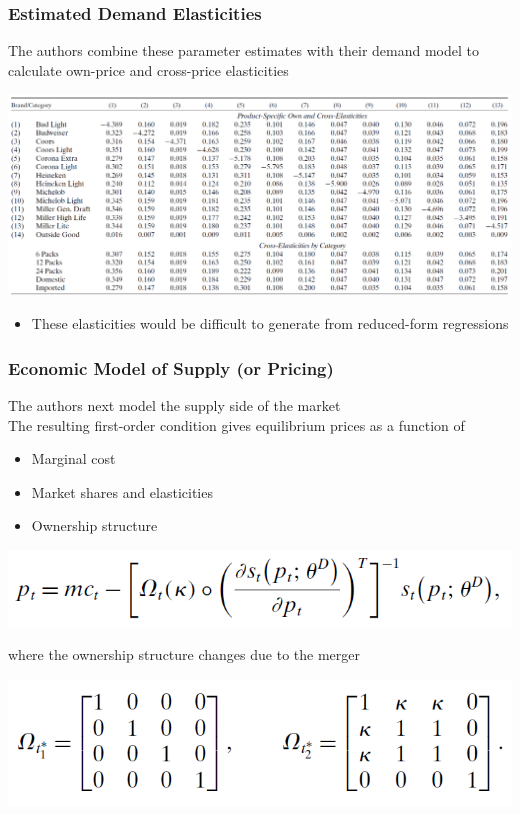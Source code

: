 \documentclass{beamer}
\begin{document}
\begin{frame}\frametitle{Estimated Demand Elasticities}
    The authors combine these parameter estimates with their demand model to calculate own-price and cross-price elasticities
    \begin{center}
        \includegraphics[width=0.95\linewidth]{table_5}
    \end{center}
    \begin{itemize}
        \item These elasticities would be difficult to generate from reduced-form regressions
    \end{itemize}
\end{frame}

\begin{frame}\frametitle{Economic Model of Supply (or Pricing)}
    The authors next model the supply side of the market \\
    \vspace{2ex}
    The resulting first-order condition gives equilibrium prices as a function of
    \begin{itemize}
        \item Marginal cost
        \item Market shares and elasticities
        \item Ownership structure
    \end{itemize}
    \begin{center}
        \includegraphics[width=0.6\linewidth]{eq_9}
    \end{center}
    where the ownership structure changes due to the merger
    \begin{center}
        \includegraphics[width=0.6\linewidth]{eq_10}
    \end{center}
\end{frame}
\end{document}
